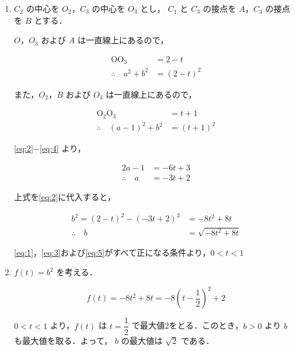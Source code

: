 \documentclass[a4paper]{ltjsarticle}
\begin{document}
\begin{enumerate}[label=(\arabic*)]
    \item $C_2$ の中心を $O_2$，$C_3$ の中心を $O_3$ とし， $C_1$ と $C_3$ の接点を $A$，$C_3$ の接点を $B$ とする．

          $O$，$O_3$ および $A$ は一直線上にあるので，

          \begin{align}
              \text{OO}_3             & =2-t\label{eq:1}     \\
              \therefore\quad a^2+b^2 & =(2-t)^2\label{eq:2}
          \end{align}

          また，$O_2$，$B$ および $O_3$ は一直線上にあるので，

          \begin{align}
              \text{O}_2\text{O}_3        & =t+1\label{eq:3}     \\
              \therefore\quad (a-1)^2+b^2 & =(t+1)^2\label{eq:4}
          \end{align}

          \eqref{eq:2}$-$\eqref{eq:4} より，

          \begin{align*}
              2a-1              & =-6t+3 \\
              \therefore\quad a & =-3t+2
          \end{align*}

          上式を\eqref{eq:2}に代入すると，

          \begin{align}
              b^2=(2-t)^2-(-3t+2)^2 & =-8t^2+8t\label{eq:5}     \\
              \therefore\quad b     & =\sqrt{-8t^2+8t}\nonumber
          \end{align}

          \eqref{eq:1}，\eqref{eq:3}および\eqref{eq:5}がすべて正になる条件より，$0<t<1$

    \item $f(t)=b^2$ を考える．

          \begin{equation*}
              f(t)=-8t^2+8t=-8\left(t-\frac{1}{2}\right)^2+2
          \end{equation*}

          $0<t<1$ より，$f(t)$ は $t=\dfrac{1}{2}$ で最大値2をとる．このとき，$b>0$ より $b$ も最大値を取る．よって， $b$ の最大値は $\sqrt{2}$ である．
\end{enumerate}
\end{document}
